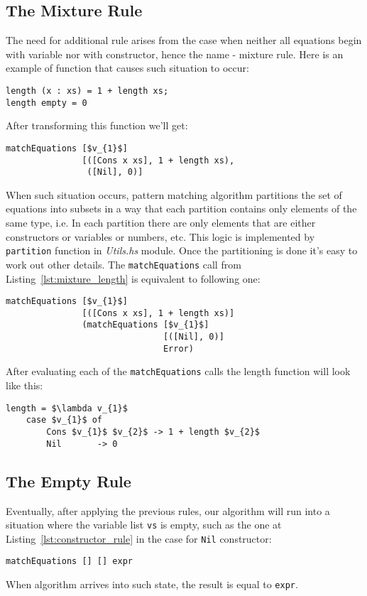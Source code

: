 \documentclass[a4paper]{report}
\begin{document}
\subsection{The Mixture Rule}
The need for additional rule arises from the case when neither all equations
begin with variable nor with constructor, hence the name - mixture rule. Here
is an example of function that causes such situation to occur:
\begin{lstlisting}
length (x : xs) = 1 + length xs;
length empty = 0
\end{lstlisting}
After transforming this function we'll get:
\begin{lstlisting}[label=lst:mixture_length, mathescape=true,
  caption={Mixture rule application.}]
matchEquations [$v_{1}$]
               [([Cons x xs], 1 + length xs),
                ([Nil], 0)]
\end{lstlisting}
When such situation occurs, pattern matching algorithm partitions the set of
equations into subsets in a way that each partition contains only elements of
the same type, i.e. In each partition there are only elements that are either
constructors or variables or numbers, etc. This logic is implemented by
\texttt{partition} function in \textit{Utils.hs} module. Once the partitioning
is done it's easy to work out other details. The \texttt{matchEquations} call
from Listing~\ref{lst:mixture_length} is equivalent to following one:
\begin{lstlisting}[mathescape=true]
matchEquations [$v_{1}$]
               [([Cons x xs], 1 + length xs)]
               (matchEquations [$v_{1}$]
                               [([Nil], 0)]
                               Error)
\end{lstlisting}
After evaluating each of the \texttt{matchEquations} calls the length function
will look like this:
\begin{lstlisting}[mathescape=true]
length = $\lambda v_{1}$
    case $v_{1}$ of
        Cons $v_{1}$ $v_{2}$ -> 1 + length $v_{2}$
        Nil       -> 0
\end{lstlisting}


\subsection{The Empty Rule}
Eventually, after applying the previous rules, our algorithm will run into a
situation where the variable list \texttt{vs} is empty, such as the one at
Listing~\ref{lst:constructor_rule} in the case for \texttt{Nil} constructor:
\begin{lstlisting}
matchEquations [] [] expr
\end{lstlisting}
When algorithm arrives into such state, the result is equal to \texttt{expr}.
\end{document}
